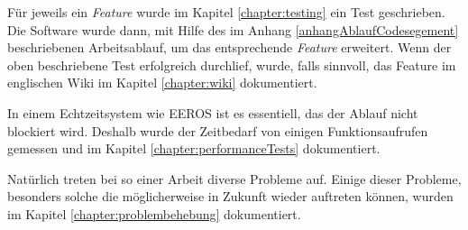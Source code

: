 Für jeweils ein \textit{Feature} wurde im Kapitel \ref{chapter:testing} ein Test geschrieben.
Die Software wurde dann, mit Hilfe des im Anhang \ref{anhangAblaufCodesegement} beschriebenen Arbeitsablauf, um das entsprechende \textit{Feature} erweitert.
Wenn der oben beschriebene Test erfolgreich durchlief, wurde, falls sinnvoll, das Feature im englischen Wiki im Kapitel \ref{chapter:wiki} dokumentiert.

In einem Echtzeitsystem wie EEROS ist es essentiell, das der Ablauf nicht blockiert wird.
Deshalb wurde der Zeitbedarf von einigen Funktionsaufrufen gemessen und im Kapitel \ref{chapter:performanceTests} dokumentiert.

Natürlich treten bei so einer Arbeit diverse Probleme auf.
Einige dieser Probleme, besonders solche die möglicherweise in Zukunft wieder auftreten können, wurden im Kapitel \ref{chapter:problembehebung} dokumentiert.


